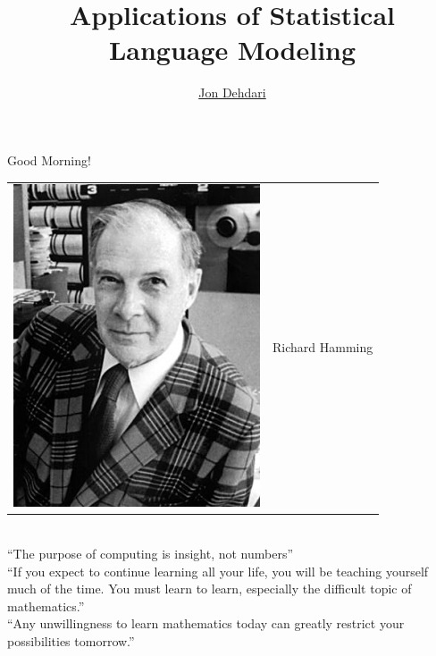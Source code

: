 \documentclass[xcolor=pdftex,x11names,table,hyperref]{beamer}
\begin{document}
\title{Applications of Statistical Language Modeling \\[1.5em]
 }
\author{\href{http://jon.dehdari.org}{Jon Dehdari}}
\frame{\titlepage}

\begin{frame}{Good Morning!}
	\begin{tabular}{ll}
		\parbox[c]{6.5em}{\includegraphics[width=0.28\textheight]{images/Richard_Hamming_from_Wikipedia.jpg} } & \hspace*{1.0em} {\Large Richard Hamming }
	\end{tabular} \\[1.6em]
		``The purpose of computing is insight, not numbers''\\[1.4em]
		\pause
		``If you expect to continue learning all your life, you will be teaching yourself much of the time. You must learn to learn, especially the difficult topic of mathematics.'' \\[1.4em]
		\pause
		``Any unwillingness to learn mathematics today can greatly restrict your possibilities tomorrow.''
\end{frame}
\end{document}

